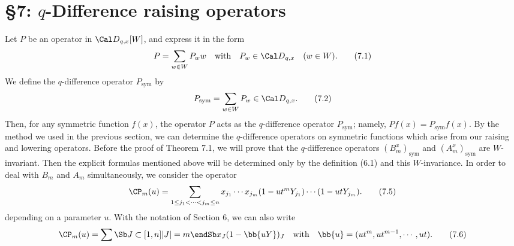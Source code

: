 \section{\S7:  $q$-Difference raising operators}
Let $P$ be an operator in ${\Cal D}_{q,x}[W]$, and express it in the form
$$
P=\sum_{w\in W} P_w w\quad\text{with}\quad P_w\in {\Cal D}_{q,x} \quad (w\in W).  
\tag{7.1}
$$
We define the $q$-difference operator $P_{\text{sym}}$ 
by 
$$
P_{\text{sym}}=\sum_{w\in W} P_w\in {\Cal D}_{q,x}. 
\tag{7.2}
$$
Then, for any symmetric function $f(x)$, the operator $P$ acts as the 
$q$-difference operator $P_{\text{sym}}$; namely, $Pf(x)=P_{\text{sym}}f(x)$.  
By the method we used in the previous section, we can determine 
the $q$-difference operators on symmetric functions which 
arise from our raising and lowering operators.
%
%
Before the proof of Theorem 7.1, 
we will prove that the $q$-difference operators 
$(B^x_m)_{\text{sym}}$ and $(A^x_m)_{\text{sym}}$ 
are $W$-invariant.  
Then the explicit formulas mentioned above will be determined only 
by the definition (6.1) and this $W$-invariance. 
In order to deal with $B_m$ and $A_m$ simultaneously, we consider the 
operator 
$$
\CP_m(u)=\sum_{1\le j_1<\cdots<j_m\le n} x_{j_1}\cdots x_{j_m} 
(1-ut^{m}Y_{j_1})\cdots(1-u t Y_{j_m}). 
\tag{7.5}
$$
depending on a parameter $u$.  
With the notation of Section 6, we can also write  
$$
\CP_m(u)=\sum\Sb J\subset[1,n]\\ |J|=m\endSb x_J (1-\bb{uY})_J
\quad\text{with}\quad \bb{u}=(ut^{m},ut^{m-1},\cdots,ut). 
\tag{7.6}
$$
